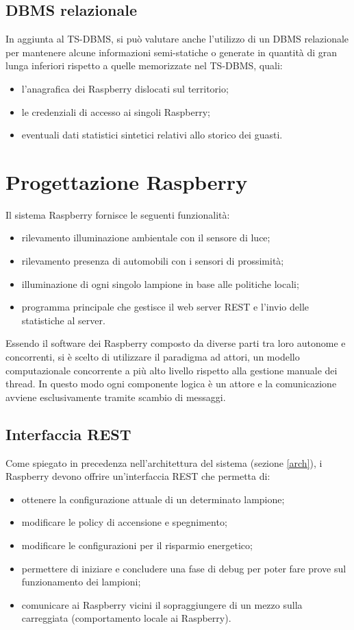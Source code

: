 \subsection{DBMS relazionale}
In aggiunta al TS-DBMS, si può valutare anche l'utilizzo di un DBMS relazionale per mantenere alcune informazioni semi-statiche o generate in quantità di gran lunga inferiori rispetto a quelle memorizzate nel TS-DBMS, quali:
\begin{itemize}
 \item l'anagrafica dei Raspberry dislocati sul territorio;
 \item le credenziali di accesso ai singoli Raspberry;
 \item eventuali dati statistici sintetici relativi allo storico dei guasti.
\end{itemize}


\section{Progettazione Raspberry}
Il sistema Raspberry fornisce le seguenti funzionalità:
\begin{itemize}
 \item rilevamento illuminazione ambientale con il sensore di luce;
 \item rilevamento presenza di automobili con i sensori di prossimità;
 \item illuminazione di ogni singolo lampione in base alle politiche locali;
 \item programma principale che gestisce il web server REST e l'invio delle statistiche al server.
\end{itemize}
Essendo il software dei Raspberry composto da diverse parti tra loro autonome e concorrenti, si è scelto di utilizzare il paradigma ad attori, un modello computazionale concorrente a più alto livello rispetto alla gestione manuale dei thread.
In questo modo ogni componente logica è un attore e la comunicazione avviene esclusivamente tramite scambio di messaggi.

\subsection{Interfaccia REST}
Come spiegato in precedenza nell'architettura del sistema (sezione \ref{arch}), i Raspberry devono offrire un'interfaccia REST che permetta di:
\begin{itemize}
	\item ottenere la configurazione attuale di un determinato lampione;
	\item modificare le policy di accensione e spegnimento;
	\item modificare le configurazioni per il risparmio energetico;
	\item permettere di iniziare e concludere una fase di debug per poter fare prove sul funzionamento dei lampioni;
	\item comunicare ai Raspberry vicini il sopraggiungere di un mezzo sulla carreggiata (comportamento locale ai Raspberry).
\end{itemize}

